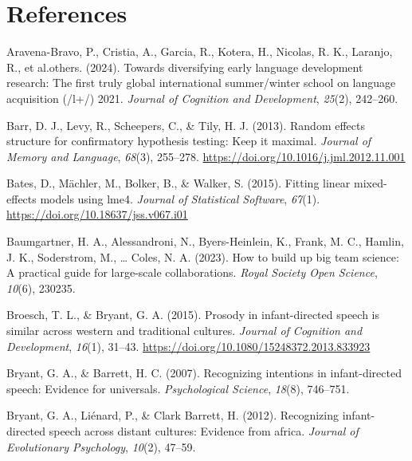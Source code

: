 \documentclass[
  english,
  ,man,floatsintext]{apa6}
\newlength{\cslhangindent}
\newenvironment{CSLReferences}[2] %
 {\begin{list}{}{%
  \setlength{\itemindent}{0pt}
  \setlength{\leftmargin}{0pt}
  \setlength{\parsep}{0pt}
  \ifodd #1
   \setlength{\leftmargin}{\cslhangindent}
   \setlength{\itemindent}{-1\cslhangindent}
  \fi
  \setlength{\itemsep}{#2\baselineskip}}}
 {\end{list}}
\begin{document}
\newpage

\section{References}\label{references}

\begingroup
\setlength{\parindent}{-0.5in}
\setlength{\leftskip}{0.5in}

\label{refs}
\begin{CSLReferences}{1}{0}
Aravena-Bravo, P., Cristia, A., Garcia, R., Kotera, H., Nicolas, R. K., Laranjo, R., et al.others. (2024). Towards diversifying early language development research: The first truly global international summer/winter school on language acquisition (/l+/) 2021. \emph{Journal of Cognition and Development}, \emph{25}(2), 242--260.

Barr, D. J., Levy, R., Scheepers, C., \& Tily, H. J. (2013). Random effects structure for confirmatory hypothesis testing: Keep it maximal. \emph{Journal of Memory and Language}, \emph{68}(3), 255--278. \url{https://doi.org/10.1016/j.jml.2012.11.001}

Bates, D., Mächler, M., Bolker, B., \& Walker, S. (2015). Fitting linear mixed-effects models using lme4. \emph{Journal of Statistical Software}, \emph{67}(1). \url{https://doi.org/10.18637/jss.v067.i01}

Baumgartner, H. A., Alessandroni, N., Byers-Heinlein, K., Frank, M. C., Hamlin, J. K., Soderstrom, M., \ldots{} Coles, N. A. (2023). How to build up big team science: A practical guide for large-scale collaborations. \emph{Royal Society Open Science}, \emph{10}(6), 230235.

Broesch, T. L., \& Bryant, G. A. (2015). Prosody in infant-directed speech is similar across western and traditional cultures. \emph{Journal of Cognition and Development}, \emph{16}(1), 31--43. \url{https://doi.org/10.1080/15248372.2013.833923}

Bryant, G. A., \& Barrett, H. C. (2007). Recognizing intentions in infant-directed speech: Evidence for universals. \emph{Psychological Science}, \emph{18}(8), 746--751.

Bryant, G. A., Liénard, P., \& Clark Barrett, H. (2012). Recognizing infant-directed speech across distant cultures: Evidence from africa. \emph{Journal of Evolutionary Psychology}, \emph{10}(2), 47--59.


\end{CSLReferences}
\end{document}
